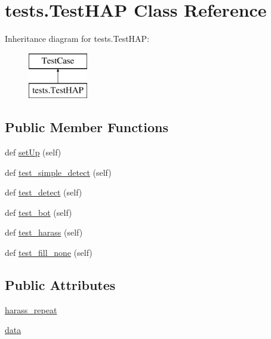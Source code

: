 \hypertarget{classtests_1_1_test_h_a_p}{}\section{tests.\+Test\+H\+AP Class Reference}
\label{classtests_1_1_test_h_a_p}
Inheritance diagram for tests.\+Test\+H\+AP\+:\begin{figure}[H]
\begin{center}
\leavevmode
\includegraphics[height=2.000000cm]{classtests_1_1_test_h_a_p}
\end{center}
\end{figure}
\subsection*{Public Member Functions}
\begin{DoxyCompactItemize}
\item 
def \hyperlink{classtests_1_1_test_h_a_p_af8cb941f3ccfbbb75d321f0698b0c7c4}{set\+Up} (self)
\item 
def \hyperlink{classtests_1_1_test_h_a_p_ad27d09e13b3cbf4e3cb45c9439d0c217}{test\+\_\+simple\+\_\+detect} (self)
\item 
def \hyperlink{classtests_1_1_test_h_a_p_a695a9a9a2155b4a385b317b9df263b16}{test\+\_\+detect} (self)
\item 
def \hyperlink{classtests_1_1_test_h_a_p_a025dcab851da00576a4fe720785ed1d3}{test\+\_\+bot} (self)
\item 
def \hyperlink{classtests_1_1_test_h_a_p_aaec5eb9ebd0dd4b49acd8acd2b465a4f}{test\+\_\+harass} (self)
\item 
def \hyperlink{classtests_1_1_test_h_a_p_a63eccfd9627a2f70a099701fede2b722}{test\+\_\+fill\+\_\+none} (self)
\end{DoxyCompactItemize}
\subsection*{Public Attributes}
\begin{DoxyCompactItemize}
\item 
\hyperlink{classtests_1_1_test_h_a_p_aecf3ec2a5e12bc64920acf9a1ed7a38c}{harass\+\_\+repeat}
\item 
\hyperlink{classtests_1_1_test_h_a_p_a87728bcf107df9fe5331b03da1b7c2f2}{data}
\end{DoxyCompactItemize}


